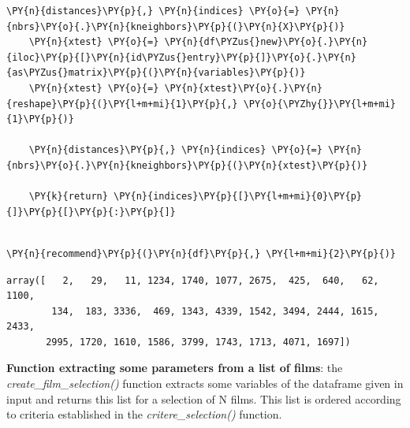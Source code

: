 \begin{tcolorbox}[breakable, size=fbox, boxrule=1pt, pad at break*=1mm,colback=cellbackground, colframe=cellborder]
\begin{Verbatim}[commandchars=\\\{\}]
    \PY{n}{distances}\PY{p}{,} \PY{n}{indices} \PY{o}{=} \PY{n}{nbrs}\PY{o}{.}\PY{n}{kneighbors}\PY{p}{(}\PY{n}{X}\PY{p}{)}    
    \PY{n}{xtest} \PY{o}{=} \PY{n}{df\PYZus{}new}\PY{o}{.}\PY{n}{iloc}\PY{p}{[}\PY{n}{id\PYZus{}entry}\PY{p}{]}\PY{o}{.}\PY{n}{as\PYZus{}matrix}\PY{p}{(}\PY{n}{variables}\PY{p}{)}
    \PY{n}{xtest} \PY{o}{=} \PY{n}{xtest}\PY{o}{.}\PY{n}{reshape}\PY{p}{(}\PY{l+m+mi}{1}\PY{p}{,} \PY{o}{\PYZhy{}}\PY{l+m+mi}{1}\PY{p}{)}

    \PY{n}{distances}\PY{p}{,} \PY{n}{indices} \PY{o}{=} \PY{n}{nbrs}\PY{o}{.}\PY{n}{kneighbors}\PY{p}{(}\PY{n}{xtest}\PY{p}{)}

    \PY{k}{return} \PY{n}{indices}\PY{p}{[}\PY{l+m+mi}{0}\PY{p}{]}\PY{p}{[}\PY{p}{:}\PY{p}{]}
    
\end{Verbatim}
\end{tcolorbox}

    \begin{tcolorbox}[breakable, size=fbox, boxrule=1pt, pad at break*=1mm,colback=cellbackground, colframe=cellborder]
\begin{Verbatim}[commandchars=\\\{\}]
\PY{n}{recommend}\PY{p}{(}\PY{n}{df}\PY{p}{,} \PY{l+m+mi}{2}\PY{p}{)}
\end{Verbatim}
\end{tcolorbox}

            \begin{tcolorbox}[breakable, boxrule=.5pt, size=fbox, pad at break*=1mm, opacityfill=0]
\begin{Verbatim}[commandchars=\\\{\}]
array([   2,   29,   11, 1234, 1740, 1077, 2675,  425,  640,   62, 1100,
        134,  183, 3336,  469, 1343, 4339, 1542, 3494, 2444, 1615, 2433,
       2995, 1720, 1610, 1586, 3799, 1743, 1713, 4071, 1697])
\end{Verbatim}
\end{tcolorbox}
        
    \textbf{Function extracting some parameters from a list of films}: the
\emph{create\_film\_selection()} function extracts some variables of the
dataframe given in input and returns this list for a selection of N
films. This list is ordered according to criteria established in the
\emph{critere\_selection()} function.


